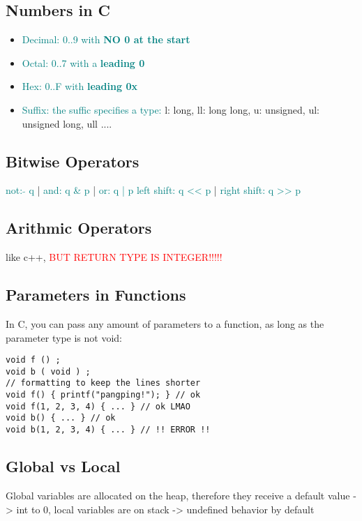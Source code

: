 \documentclass[main.tex,fontsize=8pt,paper=a4,paper=landscape,DIV=calc,]{scrartcl}
\begin{document}
\begin{multicols*}{4}
\subsection{Numbers in C}
\begin{itemize}
\item \textcolor{teal}{Decimal: 0..9 with \textbf{NO 0 at the start}}
\item \textcolor{teal}{Octal: 0..7 with a \textbf{leading 0}}
\item \textcolor{teal}{Hex: 0..F with \textbf{leading 0x}}
\item \textcolor{teal}{Suffix: the suffic specifies a type:}\newline
  l: long, ll: long long, u: unsigned, ul: unsigned long, ull ....
\end{itemize} 

\subsection{Bitwise Operators}
\textcolor{teal}{not: \(\tilde{} \) q} | \textcolor{teal}{and: q \& p} | \textcolor{teal}{or: q | p} \newline
\textcolor{teal}{left shift: q << p} | \textcolor{teal}{right shift: q >> p}

\subsection{Arithmic Operators}
like c++, \textcolor{red}{BUT RETURN TYPE IS INTEGER!!!!!}

\subsection{Parameters in Functions}
In C, you can pass any amount of parameters to a function, as long as the parameter type is not void:
\begin{lstlisting}
void f () ;
void b ( void ) ;
// formatting to keep the lines shorter
void f() { printf("pangping!"); } // ok
void f(1, 2, 3, 4) { ... } // ok LMAO
void b() { ... } // ok
void b(1, 2, 3, 4) { ... } // !! ERROR !!
\end{lstlisting}
\vspace{2mm}

\subsection{Global vs Local}
Global variables are allocated on the heap, therefore they receive a default value -> int to 0, local variables are on stack -> undefined behavior by default


\end{multicols*}
\end{document}
